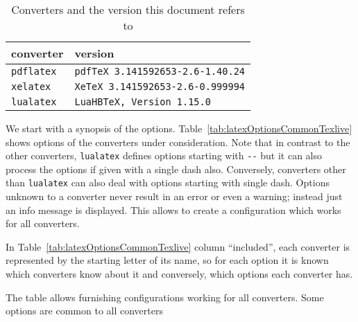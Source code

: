 \documentclass[a4paper, english]{article}%
\newcommand{\pdflatex}{\texttt{pdflatex}}
\newcommand{\lualatex}{\texttt{lualatex}}
\newcommand{\xelatex}{\texttt{xelatex}}
\begin{document}
\begin{longtable}{|ll|}
  \toprule
  converter & version \\
  \midrule
  \midrule
  \endfirsthead%
  \bottomrule
  \caption{\label{tab:versions} Converters and the version this document refers to }
  \endlastfoot%
  \pdflatex{}  & \texttt{pdfTeX 3.141592653-2.6-1.40.24} \\%
  \xelatex{}   & \texttt{XeTeX 3.141592653-2.6-0.999994} \\%
  \lualatex{}  & \texttt{LuaHBTeX, Version 1.15.0} \\
\end{longtable}


We start with a synopsis of the options. 
Table~\ref{tab:latexOptionsCommonTexlive} 
shows options of the converters under consideration. 
Note that in contrast to the other converters, 
\lualatex{} defines options starting with \texttt{-{}-} 
but it can also process the options if given with a single dash also. 
Conversely, converters other than \lualatex{} can also deal with options 
starting with single dash. 
Options unknown to a converter never result in an error or even a warning; 
instead just an info message is displayed. 
This allows to create a configuration which works for all converters. 

In Table~\ref{tab:latexOptionsCommonTexlive} column ``included'', 
each converter is represented by the starting letter of its name, 
so for each option it is known which converters know about it 
and conversely, which options each converter has. 

The table allows furnishing configurations working for all converters. 
Some options are common to all converters
\end{document}
